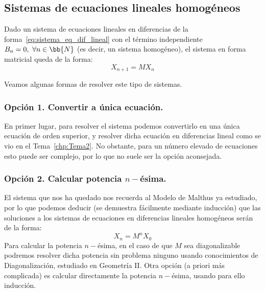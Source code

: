 \subsection{Sistemas de ecuaciones lineales homogéneos}

Dado un sistema de ecuaciones lineales en diferencias de la forma~\ref{eq:sistema_eq_dif_lineal} con el término independiente $B_n=0,~ \forall n \in \bb{N}$ (es decir, un sistema homogéneo), el sistema en forma matricial queda de la forma:
\begin{equation}\label{eq:sistema_eq_dif_lineal_Homogeneo}
    X_{n+1} = M X_n
\end{equation}

Veamos algunas formas de resolver este tipo de sistemas.
\subsubsection{Opción 1. Convertir a única ecuación.}
En primer lugar, para resolver el sistema podemos convertirlo en una única ecuación de orden superior, y resolver dicha ecuación en diferencias lineal como se vio en el Tema~\ref{chp:Tema2}. No obstante, para un número elevado de ecuaciones esto puede ser complejo, por lo que no suele ser la opción aconsejada.

\subsubsection{Opción 2. Calcular potencia $n-$ésima.}
El sistema que nos ha quedado nos recuerda al Modelo de Malthus ya estudiado, por lo que podemos deducir (se demuestra fácilmente mediante inducción) que las soluciones a los sistemas de ecuaciones en diferencias lineales homogéneos serán de la forma:
\begin{equation*}
    X_n = M^n X_0
\end{equation*}
Para calcular la potencia $n-$ésima, en el caso de que $M$ sea diagonalizable podremos resolver dicha potencia sin problema ninguno usando conocimientos de Diagonalización, estudiado en Geometría II. Otra opción (a priori más complicada) es calcular directamente la potencia $n-$ésima, usando para ello inducción.

